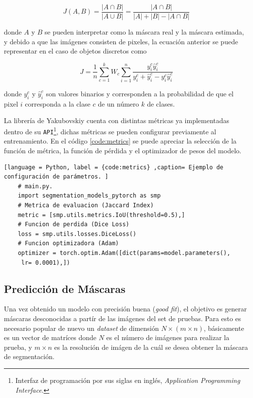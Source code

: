 \begin{equation}\label{eq:jacc}
    J(A,B) = \frac{|A \cap B|}{| A \cup B |} = \frac{|A \cap B|}{|A| + |B| - |A \cap B|}
\end{equation} 

donde $A$ y $B$ se pueden interpretar como la máscara real y la máscara estimada, y debido a que las imágenes consisten de pixeles, la ecuación anterior se puede representar en el caso de objetos discretos como

\begin{equation}
    J = \frac{1}{n} \sum_{c=1}^{k} W_c \sum_{i=1}^{n}\frac{y_i^c \hat y_i^c}{y_i^c + \hat y_i^c - y_i^c \hat y_i^c}
\end{equation} 

donde $y_i^c$ y $\hat y_i^c$ son valores binarios y corresponden a la probabilidad de que el pixel $i$ corresponda a la clase $c$ de un número $k$ de clases.

La librería de Yakubovskiy \citep{Yakubovskiy:2019} cuenta con distintas métricas ya implementadas dentro de su \texttt{API}\footnote{Interfaz de programación por sus siglas en inglés, \emph{Application Programming Interface}.}, dichas métricas se pueden configurar previamente al entrenamiento. En el código \ref{code:metrics} se puede apreciar la selección de la función de métrica, la función de pérdida y el optimizador de pesos del modelo.

\begin{lstlisting}[language = Python, label = {code:metrics} ,caption= Ejemplo de configuración de parámetros. ]
    # main.py.
    import segmentation_models_pytorch as smp 
    # Metrica de evaluacion (Jaccard Index)
    metric = [smp.utils.metrics.IoU(threshold=0.5),]
    # Funcion de perdida (Dice Loss)
    loss = smp.utils.losses.DiceLoss()
    # Funcion optimizadora (Adam)
    optimizer = torch.optim.Adam([dict(params=model.parameters(),
     lr= 0.0001),])
\end{lstlisting}

\subsection{Predicción de Máscaras} 
Una vez obtenido un modelo con precisión buena (\emph{good fit}), el objetivo es generar máscaras desconocidas a partír de las imágenes del set de pruebas. Para esto es necesario popular de nuevo un \emph{dataset} de dimensión $N \times (m \times n)$, básicamente es un vector de matríces donde $N$ es el número de imágenes para realizar la prueba, y $m \times n$ es la resolución de imágen de la cuál se desea obtener la máscara de segmentación.

